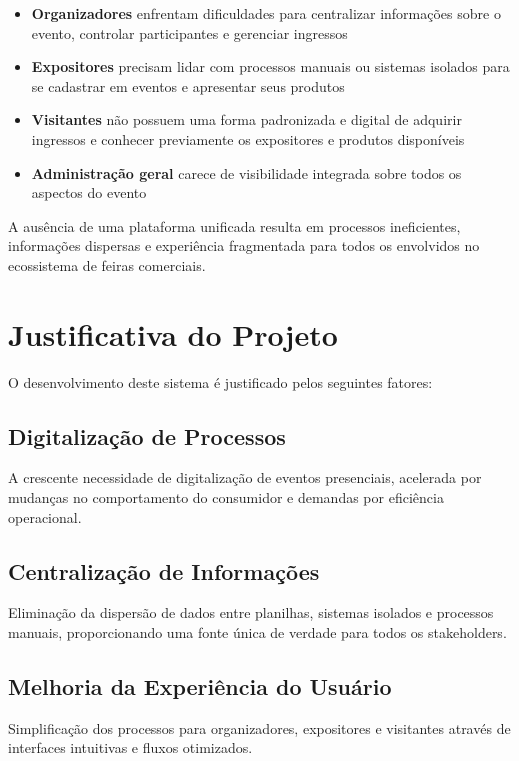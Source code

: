 \documentclass[12pt,a4paper]{article}
\begin{document}
\begin{itemize}
    \item \textbf{Organizadores} enfrentam dificuldades para centralizar informações sobre o evento, controlar participantes e gerenciar ingressos
    \item \textbf{Expositores} precisam lidar com processos manuais ou sistemas isolados para se cadastrar em eventos e apresentar seus produtos
    \item \textbf{Visitantes} não possuem uma forma padronizada e digital de adquirir ingressos e conhecer previamente os expositores e produtos disponíveis
    \item \textbf{Administração geral} carece de visibilidade integrada sobre todos os aspectos do evento
\end{itemize}

A ausência de uma plataforma unificada resulta em processos ineficientes, informações dispersas e experiência fragmentada para todos os envolvidos no ecossistema de feiras comerciais.

\section{Justificativa do Projeto}

O desenvolvimento deste sistema é justificado pelos seguintes fatores:

\subsection{Digitalização de Processos}
A crescente necessidade de digitalização de eventos presenciais, acelerada por mudanças no comportamento do consumidor e demandas por eficiência operacional.

\subsection{Centralização de Informações}
Eliminação da dispersão de dados entre planilhas, sistemas isolados e processos manuais, proporcionando uma fonte única de verdade para todos os stakeholders.

\subsection{Melhoria da Experiência do Usuário}
Simplificação dos processos para organizadores, expositores e visitantes através de interfaces intuitivas e fluxos otimizados.
\end{document}
